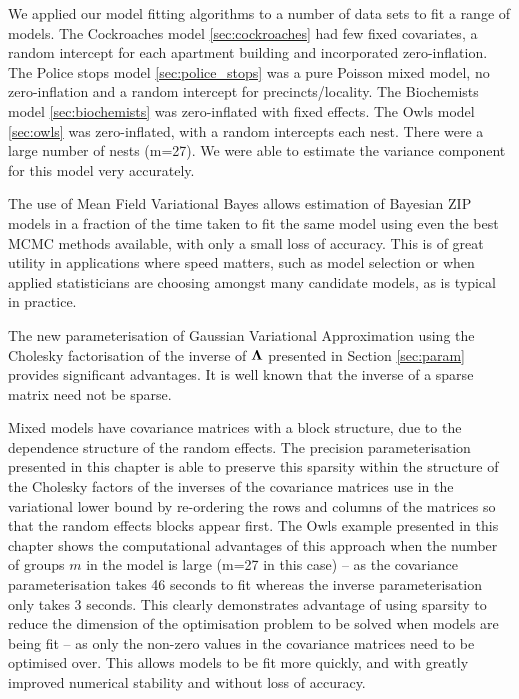 We applied our model fitting algorithms to a number of data sets to fit a range
of models. The Cockroaches model \ref{sec:cockroaches} had few fixed
covariates, a random intercept for each apartment building and incorporated
zero-inflation. The Police stops model \ref{sec:police_stops} was a pure
Poisson mixed model, no zero-inflation and a random intercept for
precincts/locality. The Biochemists model \ref{sec:biochemists} was
zero-inflated with fixed effects. The Owls model \ref{sec:owls} was
zero-inflated,  with a random intercepts each nest. There were a large number
of nests (m=27). We were able to estimate the variance component for this model
very accurately.

The use of Mean Field Variational Bayes allows estimation of Bayesian ZIP
models in a fraction of the time taken to fit the same model using even the
best MCMC methods available, with only a small loss of accuracy. This is of
great utility in applications where speed matters, such as model selection or
when applied statisticians are choosing amongst many candidate models, as is
typical in practice.
		
The new parameterisation of Gaussian Variational Approximation using the
Cholesky factorisation of the inverse of ${\boldsymbol \Lambda}$ presented in Section
\ref{sec:param} provides significant advantages.  It is well known that the
inverse of a sparse matrix need not be sparse.

Mixed models have covariance matrices with a block structure, due to the
dependence structure of the random effects. The precision parameterisation
presented in this chapter is able to preserve this sparsity within the
structure of the Cholesky factors of the inverses of the covariance matrices
use in the variational lower bound by re-ordering the rows and columns of the
matrices so that the random effects blocks appear first. The Owls example
presented in this chapter shows the computational advantages of this approach
when the number of groups $m$ in the model is large (m=27 in this case) -- as
the covariance parameterisation takes 46 seconds to fit whereas the inverse
parameterisation only takes 3 seconds. This clearly demonstrates advantage of
using sparsity to reduce the dimension of the optimisation problem to be solved
when models are being fit -- as only the non-zero values in the covariance
matrices need to be optimised over. This allows models to be fit more quickly,
and with greatly improved numerical stability and without loss of accuracy.


